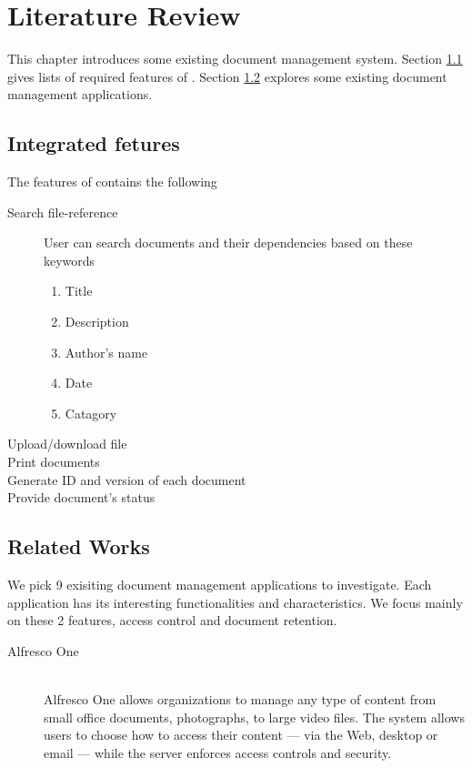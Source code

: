 \chapter{Literature Review}
This chapter introduces some existing document management system.
Section \ref{dms-features} gives lists of required features of \dms.
Section \ref{relate-works} explores some existing document management applications.

\section{Integrated fetures} \label{dms-features}
The features of \dms contains the following
\begin{description}
\item[Search file-reference]
User can search documents and their dependencies based on these keywords
\begin{enumerate}
\item Title
\item Description
\item Author's name
\item Date
\item Catagory
\end{enumerate}

\item[Upload/download file]
\item[Print documents]
\item[Generate ID and version of each document]
\item[Provide document's status]
\end{description}

\section{Related Works} \label{relate-works}
We pick 9 exisiting document management applications to investigate.
Each application has its interesting functionalities and characteristics.
We focus mainly on these 2 features, access control and document retention.
\begin{description}
\item[Alfresco One] \hfill \\
Alfresco One allows organizations to manage any type of content from small office documents, photographs, to large video files.
The system allows users to choose how to access their content --- via the Web, desktop or email --- while the server enforces access controls and security.
\end{description}